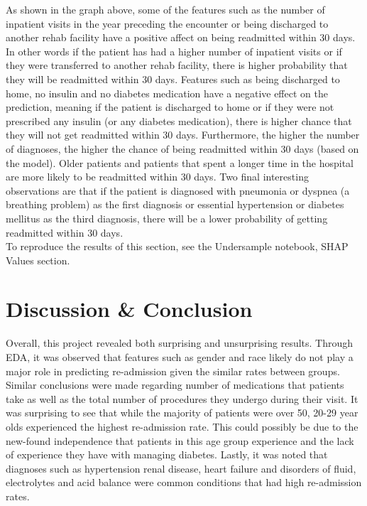 \documentclass[letterpaper, 10 pt, conference]{ieeeconf}  %
\begin{document}
As shown in the graph above, some of the features such as the number of inpatient visits in the year preceding the encounter or being discharged to another rehab facility have a positive affect on being readmitted within 30 days. In other words if the patient has had a higher number of inpatient visits or if they were transferred to another rehab facility, there is higher probability that they will be readmitted within 30 days. Features such as being discharged to home, no insulin and no diabetes medication have a negative effect on the prediction, meaning if the patient is discharged to home or if they were not prescribed any insulin (or any diabetes medication), there is higher chance that they will not get readmitted within 30 days. Furthermore, the higher the number of diagnoses, the higher the chance of being readmitted within 30 days (based on the model). Older patients and patients that spent a longer time in the hospital are more likely to be readmitted within 30 days. Two final interesting observations are that if the patient is diagnosed with pneumonia or dyspnea (a breathing problem) as the first diagnosis or essential hypertension or diabetes mellitus as the third diagnosis, there will be a lower probability of getting readmitted within 30 days.\\

To reproduce the results of this section, see the Undersample notebook, SHAP Values section.

\section{Discussion & Conclusion}

Overall, this project revealed both surprising and unsurprising results. Through EDA, it was observed that features such as gender and race likely do not play a major role in predicting re-admission given the similar rates between groups. Similar conclusions were made regarding number of medications that patients take as well as the total number of procedures they undergo during their visit. It was surprising to see that while the majority of patients were over 50, 20-29 year olds experienced the highest re-admission rate. This could possibly be due to the new-found independence that patients in this age group experience and the lack of experience they have with managing diabetes. Lastly, it was noted that diagnoses such as hypertension renal disease, heart failure and disorders of fluid, electrolytes and acid balance were common conditions that had high re-admission rates. 
\end{document}
